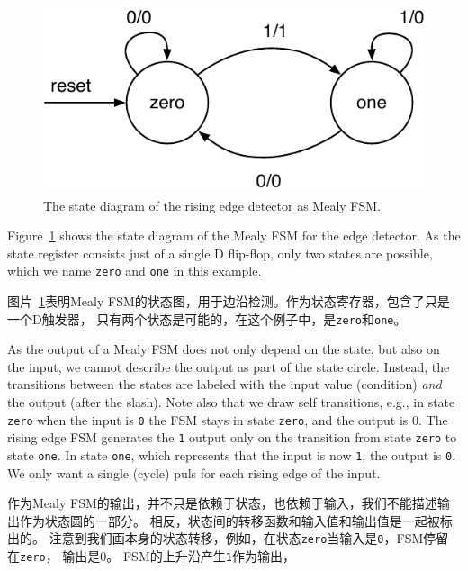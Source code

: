 \documentclass[%
    10pt,
    headinclude, footexclude,
    openright, %
    notitlepage,
    cleardoubleempty,
    headsepline,
    pointlessnumbers,
    bibtotoc, idxtotoc,
    ]{scrbook}
\newcommand{\code}[1]{{\small{\texttt{#1}}}}
\newcommand{\scale}{0.7}
\begin{document}
{\begin{figure}
  \centering
  \includegraphics[scale=\scale]{figures/state-diag-mealy}
  \caption{The state diagram of the rising edge detector as Mealy FSM.}
  \label{fig:diag:mealy}
\end{figure}

Figure~\ref{fig:diag:mealy} shows the state diagram of the Mealy FSM for the
edge detector. As the state register consists just of a single D flip-flop,
only two states are possible, which we name \code{zero} and \code{one} in this
example.

图片~\ref{fig:diag:mealy}表明Mealy FSM的状态图，用于边沿检测。作为状态寄存器，包含了只是一个D触发器，
只有两个状态是可能的，在这个例子中，是\code{zero}和\code{one}。

As the output of a Mealy FSM does not only depend on the state, but also
on the input, we cannot describe the output as part of the state circle.
Instead, the transitions between the states are labeled with the input
value (condition) \emph{and} the output (after the slash).
Note also that we draw self transitions, e.g., in state \code{zero} when
the input is \code{0} the FSM stays in state \code{zero}, and the output is {0}.
The rising edge FSM generates the \code{1} output only on the transition
from state \code{zero} to state \code{one}. In state \code{one}, which represents
that the input is now \code{1}, the output is \code{0}. We only want a single (cycle)
puls for each rising edge of the input.

作为Mealy FSM的输出，并不只是依赖于状态，也依赖于输入，我们不能描述输出作为状态圆的一部分。
相反，状态间的转移函数和输入值和输出值是一起被标出的。
注意到我们画本身的状态转移，例如，在状态\code{zero}当输入是\code{0}，FSM停留在\code{zero}，
输出是{0}。
FSM的上升沿产生\code{1}作为输出，


}
\end{document}
